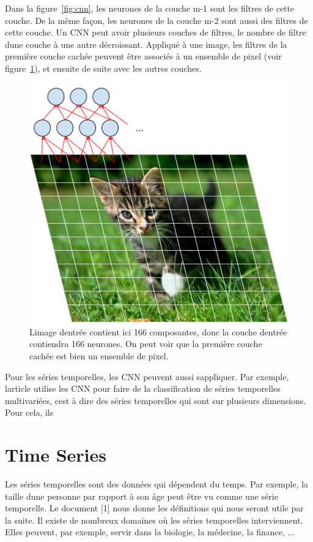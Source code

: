 \documentclass[11pt]{sdm}
\begin{document}
			Dans la figure~\ref{fig:cnn}, les neurones de la couche m-1 sont les filtres de cette couche. De la m\^eme fa\c con, les neurones de la couche m-2 sont aussi des filtres de cette couche. Un CNN peut avoir plusieurs couches de filtres, le nombre de filtre d\textquotesingle une couche \`a une autre d\'ecroissant.
			Appliqu\'e \`a une image, les filtres de la premi\`ere couche cach\'ee peuvent \^etre associ\'es \`a un ensemble de pixel (voir figure~\ref{fig:cnnChat}), et ensuite de suite avec les autres couches.

			\begin{figure}[!ht]
				\centering
				\includegraphics[natwidth=474,natheight=504,scale=0.6]{figures/cnnOnImage.png}
				\caption{L\textquotesingle image d\textquotesingle entr\'ee contient ici 166 composantes, donc la couche d\textquotesingle entr\'ee contiendra 166 neurones. On peut voir que la premi\`ere couche cach\'ee est bien un ensemble de pixel.}
				\label{fig:cnnChat}
			\end{figure}

			Pour les s\'eries temporelles, les CNN peuvent aussi s\textquotesingle appliquer. Par exemple, l\textquotesingle article \cite{zheng2014time} utilise les CNN pour faire de la classification de s\'eries temporelles multivari\'ees, c\textquotesingle est \`a dire des s\'eries temporelles qui sont sur plusieurs dimensions. Pour cela, ils 





\section{Time Series}
	Les s\'eries temporelles sont des donn\'ees qui d\'ependent du temps. Par exemple, la taille d\textquotesingle une personne par rapport \`a son âge peut \^etre vu comme une s\'erie temporelle. Le document [1] nous donne les d\'efinitions qui nous seront utile par la suite.
	Il existe de nombreux domaines o\`u les s\'eries temporelles interviennent. Elles peuvent, par exemple, servir dans la biologie, la m\'edecine, la finance, ...
\end{document}
